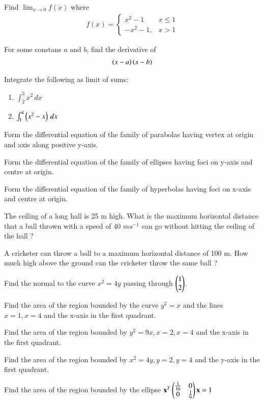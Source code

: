 %
\item Find $\lim_{x\to 0} f(x)$ where
\begin{align}
f(x) = 
\begin{cases}
x^2-1 & x \le 1
\\
-x^2-1, & x > 1
\end{cases}
\end{align}
%
\item For some constans $a$ and $b$, find the derivative of
%
\begin{align}
\left(x-a\right)\left(x-b\right)
\end{align}
%
%
\item Integrate the following as limit of sums:
\begin{enumerate}[label = (\roman*)]
\item $\int_{2}^{3}x^2\, dx$
\item $\int_{1}^{4}\left(x^2-x\right)\, dx$
\end{enumerate}
\item Form the differential equation of the family of parabolas having vertex at origin and axis along positive y-axis.
\item  Form the differential equation of the family of ellipses having foci on y-axis and centre at origin.
\item  Form the differential equation of the family of hyperbolas having foci on x-axis and centre at origin.
\item The ceiling of a long hall is 25 m high. What is the maximum horizontal distance that a ball thrown with a speed of 40 $m s^{-1}$
can go without hitting the ceiling of the hall ?
\item  A cricketer can throw a ball to a maximum horizontal distance of 100 m. How much high above the ground can the cricketer throw the same ball ?
\item  Find the normal to the curve $x^2=4y$ passing through $\begin{pmatrix}1\\2\end{pmatrix}$.
%
\item Find the area of the region bounded by the curve $y^2= x$ and the lines $x = 1, x = 4$ and the x-axis in the first quadrant.
\item  Find the area of the region bounded by $y^2=9x, x=2, x=4$ and the x-axis in the  first quadrant.
%
\item Find the area of the region bounded by $x^2 = 4y, y = 2, y = 4$ and the y-axis in the first quadrant.
\item Find the area of the region bounded by the ellipse 
$
\mathbf{x}^T\begin{pmatrix}\frac{1}{16} & 0 \\ 0 & \frac{1}{9}\end{pmatrix}\mathbf{x} = 1
$

